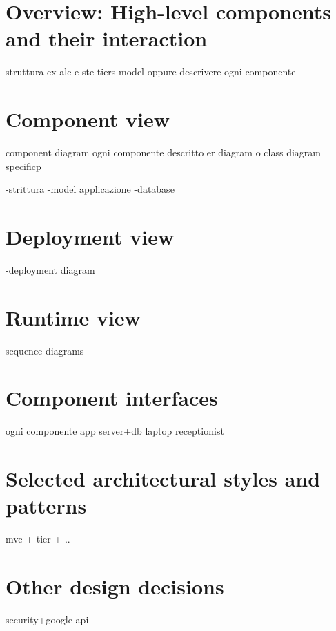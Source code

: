 \section{Overview: High-level components and their interaction}
struttura ex ale e ste tiers model oppure descrivere ogni componente



\section{Component view}
component diagram ogni componente descritto
er diagram o class diagram specificp

-strittura
-model applicazione
-database


\section{Deployment view}
-deployment diagram

\section{Runtime view}
sequence diagrams

\section{Component interfaces}
ogni componente
app
server+db
laptop receptionist

\section{Selected architectural styles and patterns}
mvc + tier + ..

\section{Other design decisions}

security+google api


